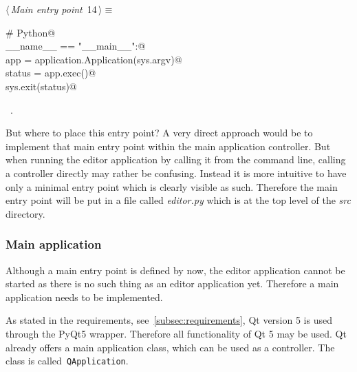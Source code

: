 \documentclass[
    a4paper,      %
    10pt,         %
    openright,    %
    notitlepage,  %
    parskip=half, %
]{scrreprt}       %
\theoremstyle{definition}                    %
\begin{document}
\begin{flushleft} \small
\begin{minipage}{\linewidth}\label{scrap1}\raggedright\small
{} $\langle\,${\itshape Main entry point}\nobreak\ {\footnotesize {14}}$\,\rangle\equiv$
\vspace{-1ex}
\begin{list}{}{} \item
\mbox{}\lstinline@# Python@\\
\mbox{}\lstinline@if __name__ == "__main__":@\\
\mbox{}\lstinline@    app = application.Application(sys.argv)@\\
\mbox{}\lstinline@    status = app.exec()@\\
\mbox{}\lstinline@    sys.exit(status)@\\
\mbox{}\lstinline@@{\NWsep}
\end{list}
\vspace{-1.5ex}
\footnotesize
\begin{list}{}{\setlength{\itemsep}{-\parsep}\setlength{\itemindent}{-\leftmargin}}
\item \NWtxtMacroRefIn\ .

\item{}
\end{list}
\end{minipage}\vspace{4ex}
\end{flushleft}
But where to place this entry point? A very direct approach would be to
implement that main entry point within the main application controller. But when
running the editor application by calling it from the command line, calling a
controller directly may rather be confusing. Instead it is more intuitive to
have only a minimal entry point which is clearly visible as such. Therefore the
main entry point will be put in a file called \textit{editor.py} which is at the
top level of the \textit{src} directory.

\subsubsection{Main application}
\label{ssubsec:main-application}

Although a main entry point is defined by now, the editor application cannot be
started as there is no such thing as an editor application yet. Therefore a main
application needs to be implemented.

As stated in the requirements, see~\autoref{subsec:requirements}, Qt version 5
is used through the PyQt5 wrapper. Therefore all functionality of Qt 5 may be
used. Qt already offers a main application class, which can be used as a
controller. The class is called~\verb+QApplication+.
\end{document}
